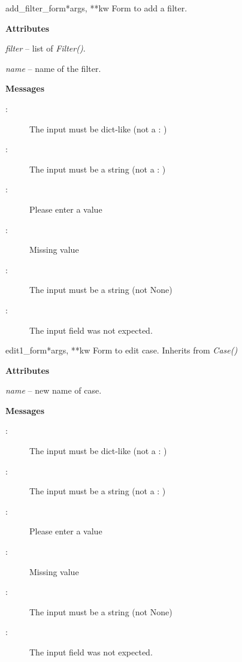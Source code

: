 \documentclass[letterpaper,10pt,english]{manual}
\begin{document}
\hypertarget{webscavator.forms.forms.add_filter_form}{}\begin{classdesc}{add\_filter\_form}{*args, **kw}
Form to add a filter.

\textbf{Attributes}

\emph{filter} -- list of \emph{Filter()}.

\emph{name} -- name of the filter.

\textbf{Messages}
\begin{description}
\item[:]
The input must be dict-like (not a : )

\item[:]
The input must be a string (not a : )

\item[:]
Please enter a value

\item[:]
Missing value

\item[:]
The input must be a string (not None)

\item[:]
The input field  was not expected.

\end{description}
\end{classdesc}

\hypertarget{webscavator.forms.forms.edit1_form}{}\begin{classdesc}{edit1\_form}{*args, **kw}
Form to edit case. Inherits from \emph{Case()}

\textbf{Attributes}

\emph{name} -- new name of case.

\textbf{Messages}
\begin{description}
\item[:]
The input must be dict-like (not a : )

\item[:]
The input must be a string (not a : )

\item[:]
Please enter a value

\item[:]
Missing value

\item[:]
The input must be a string (not None)

\item[:]
The input field  was not expected.

\end{description}
\end{classdesc}
\end{document}
